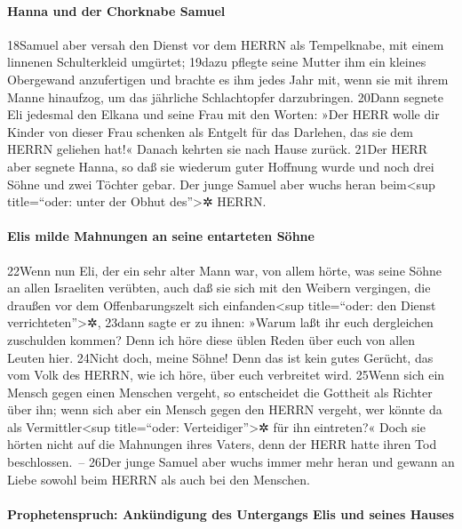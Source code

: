 \hypertarget{hanna-und-der-chorknabe-samuel}{%
\paragraph{Hanna und der Chorknabe
Samuel}\label{hanna-und-der-chorknabe-samuel}}

18Samuel aber versah den Dienst vor dem HERRN als Tempelknabe, mit einem
linnenen Schulterkleid umgürtet; 19dazu pflegte seine Mutter ihm ein
kleines Obergewand anzufertigen und brachte es ihm jedes Jahr mit, wenn
sie mit ihrem Manne hinaufzog, um das jährliche Schlachtopfer
darzubringen. 20Dann segnete Eli jedesmal den Elkana und seine Frau mit
den Worten: »Der HERR wolle dir Kinder von dieser Frau schenken als
Entgelt für das Darlehen, das sie dem HERRN geliehen hat!« Danach
kehrten sie nach Hause zurück. 21Der HERR aber segnete Hanna, so daß sie
wiederum guter Hoffnung wurde und noch drei Söhne und zwei Töchter
gebar. Der junge Samuel aber wuchs heran beim\textless sup title=``oder:
unter der Obhut des''\textgreater✲ HERRN.

\hypertarget{elis-milde-mahnungen-an-seine-entarteten-suxf6hne}{%
\paragraph{Elis milde Mahnungen an seine entarteten
Söhne}\label{elis-milde-mahnungen-an-seine-entarteten-suxf6hne}}

22Wenn nun Eli, der ein sehr alter Mann war, von allem hörte, was seine
Söhne an allen Israeliten verübten, auch daß sie sich mit den Weibern
vergingen, die draußen vor dem Offenbarungszelt sich
einfanden\textless sup title=``oder: den Dienst
verrichteten''\textgreater✲, 23dann sagte er zu ihnen: »Warum laßt ihr
euch dergleichen zuschulden kommen? Denn ich höre diese üblen Reden über
euch von allen Leuten hier. 24Nicht doch, meine Söhne! Denn das ist kein
gutes Gerücht, das vom Volk des HERRN, wie ich höre, über euch
verbreitet wird. 25Wenn sich ein Mensch gegen einen Menschen vergeht, so
entscheidet die Gottheit als Richter über ihn; wenn sich aber ein Mensch
gegen den HERRN vergeht, wer könnte da als Vermittler\textless sup
title=``oder: Verteidiger''\textgreater✲ für ihn eintreten?« Doch sie
hörten nicht auf die Mahnungen ihres Vaters, denn der HERR hatte ihren
Tod beschlossen.~-- 26Der junge Samuel aber wuchs immer mehr heran und
gewann an Liebe sowohl beim HERRN als auch bei den Menschen.

\hypertarget{prophetenspruch-ankuxfcndigung-des-untergangs-elis-und-seines-hauses}{%
\paragraph{Prophetenspruch: Ankündigung des Untergangs Elis und seines
Hauses}\label{prophetenspruch-ankuxfcndigung-des-untergangs-elis-und-seines-hauses}}

